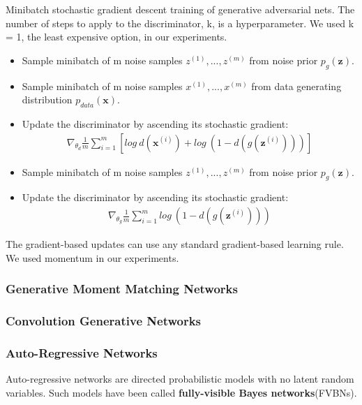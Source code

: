 \documentclass[12pt]{article}
\numberwithin{equation}{section}
\begin{document}
	\begin{algorithm}
	\caption{Minibatch stochastic gradient descent training of generative adversarial nets. The number of steps to apply to the discriminator, k, is a hyperparameter. We used k = 1, the least expensive option, in our experiments.}\label{euclid}
	\begin{algorithmic}[]	
            		\begin{itemize}
			\item Sample minibatch of m noise samples ${z^{(1)}, . . . , z^{(m)}}$ from noise prior $p_g(\bm{z})$.
			\item Sample minibatch of m noise samples ${x^{(1)}, . . . , x^{(m)}}$ from data generating distribution $p_{data}(\bm{x})$.
			\item Update the discriminator by ascending its stochastic gradient:
			\begin{align*}
				\nabla_{\theta_d}\frac{1}{m}\sum_{i=1}^m [log \ d(\bm{x}^{(i)})+ log \ (1-d(g(\bm{z}^{(i)})))]
			\end{align*}
			\end{itemize}
		\EndFor
		\begin{itemize}
			\item Sample minibatch of m noise samples ${z^{(1)}, . . . , z^{(m)}}$ from noise prior $p_g(\bm{z})$.
			\item Update the discriminator by ascending its stochastic gradient:
			\begin{align*}
				\nabla_{\theta_g}\frac{1}{m}\sum_{i=1}^m log \ (1-d(g(\bm{z}^{(i)})))
			\end{align*}
			\end{itemize}
        \EndFor \par
        The gradient-based updates can use any standard gradient-based learning rule. We used momentum in our experiments.
	\end{algorithmic}
	\end{algorithm}
\subsubsection{Generative Moment Matching Networks}
\subsubsection{Convolution Generative Networks}
\subsubsection{Auto-Regressive Networks}
	Auto-regressive networks are directed probabilistic models with no latent random variables. Such models have been called \textbf{fully-visible Bayes networks}(FVBNs).\par
\end{document}
